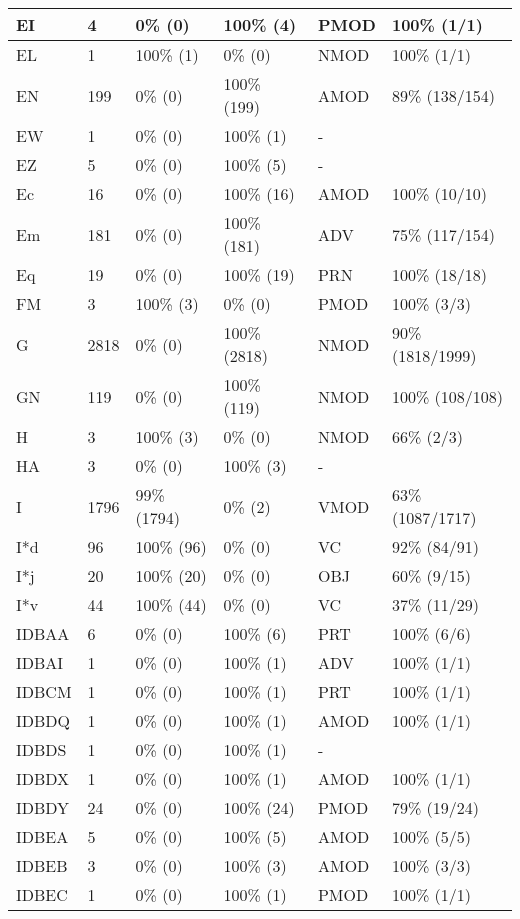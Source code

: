 \begin{figure*}
\begin{tabular}{|l|l|l|l||l|l|}
 EI & 4 & 0\% (0) & 100\% (4) & PMOD & 100\% (1/1) \\ 
\hline
 EL & 1 & 100\% (1) & 0\% (0) & NMOD & 100\% (1/1) \\ 
\hline
 EN & 199 & 0\% (0) & 100\% (199) & AMOD & 89\% (138/154) \\ 
\hline
 EW & 1 & 0\% (0) & 100\% (1) & - &  \\ 
\hline
 EZ & 5 & 0\% (0) & 100\% (5) & - &  \\ 
\hline
 Ec & 16 & 0\% (0) & 100\% (16) & AMOD & 100\% (10/10) \\ 
\hline
 Em & 181 & 0\% (0) & 100\% (181) & ADV & 75\% (117/154) \\ 
\hline
 Eq & 19 & 0\% (0) & 100\% (19) & PRN & 100\% (18/18) \\ 
\hline
 FM & 3 & 100\% (3) & 0\% (0) & PMOD & 100\% (3/3) \\ 
\hline
 G & 2818 & 0\% (0) & 100\% (2818) & NMOD & 90\% (1818/1999) \\ 
\hline
 GN & 119 & 0\% (0) & 100\% (119) & NMOD & 100\% (108/108) \\ 
\hline
 H & 3 & 100\% (3) & 0\% (0) & NMOD & 66\% (2/3) \\ 
\hline
 HA & 3 & 0\% (0) & 100\% (3) & - &  \\ 
\hline
 I & 1796 & 99\% (1794) & 0\% (2) & VMOD & 63\% (1087/1717) \\ 
\hline
 I*d & 96 & 100\% (96) & 0\% (0) & VC & 92\% (84/91) \\ 
\hline
 I*j & 20 & 100\% (20) & 0\% (0) & OBJ & 60\% (9/15) \\ 
\hline
 I*v & 44 & 100\% (44) & 0\% (0) & VC & 37\% (11/29) \\ 
\hline
 IDBAA & 6 & 0\% (0) & 100\% (6) & PRT & 100\% (6/6) \\ 
\hline
 IDBAI & 1 & 0\% (0) & 100\% (1) & ADV & 100\% (1/1) \\ 
\hline
 IDBCM & 1 & 0\% (0) & 100\% (1) & PRT & 100\% (1/1) \\ 
\hline
 IDBDQ & 1 & 0\% (0) & 100\% (1) & AMOD & 100\% (1/1) \\ 
\hline
 IDBDS & 1 & 0\% (0) & 100\% (1) & - &  \\ 
\hline
 IDBDX & 1 & 0\% (0) & 100\% (1) & AMOD & 100\% (1/1) \\ 
\hline
 IDBDY & 24 & 0\% (0) & 100\% (24) & PMOD & 79\% (19/24) \\ 
\hline
 IDBEA & 5 & 0\% (0) & 100\% (5) & AMOD & 100\% (5/5) \\ 
\hline
 IDBEB & 3 & 0\% (0) & 100\% (3) & AMOD & 100\% (3/3) \\ 
\hline
 IDBEC & 1 & 0\% (0) & 100\% (1) & PMOD & 100\% (1/1) \\ 
\hline
\end{tabular}
\end{figure*}
